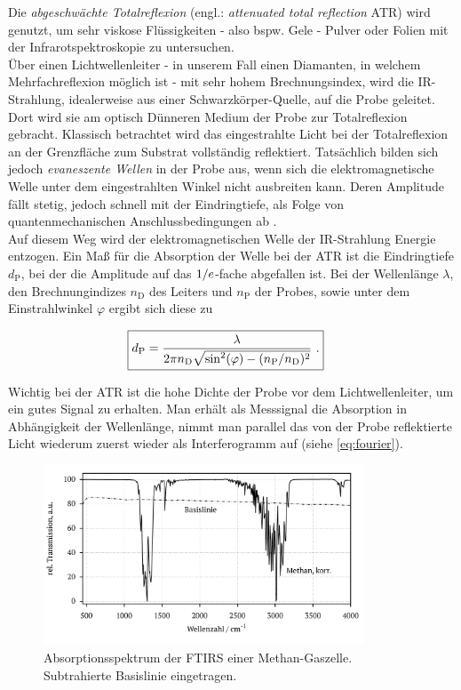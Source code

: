 \documentclass[numbers=noenddot,a4paper,10pt,twocolumn]{article}
\newcommand{\ix}[1]{_\text{#1}}
\newcommand{\tilt}[1]{\textit{#1}}
\newcommand{\euler}{\mathnormal{e}}
\begin{document}
		Die \tilt{abgeschw\"achte Totalreflexion} (engl.: \tilt{attenuated total reflection} ATR) wird genutzt, um sehr viskose Fl\"ussigkeiten - also bspw. Gele - Pulver oder Folien mit der Infrarotspektroskopie zu untersuchen.\\
		\"Uber einen Lichtwellenleiter - in unserem Fall einen Diamanten, in welchem Mehrfachreflexion m\"oglich ist - mit sehr hohem Brechnungsindex, wird die IR-Strahlung, idealerweise aus einer Schwarzk\"orper-Quelle, auf die Probe geleitet. Dort wird sie am optisch D\"unneren Medium der Probe zur Totalreflexion gebracht. Klassisch betrachtet wird das eingestrahlte Licht bei der Totalreflexion an der Grenzfl\"ache zum Substrat vollst\"andig reflektiert. Tats\"achlich bilden sich jedoch \tilt{evaneszente Wellen} in der Probe aus, wenn sich die elektromagnetische Welle unter dem eingestrahlten Winkel nicht ausbreiten kann. Deren Amplitude f\"allt stetig, jedoch schnell mit der Eindringtiefe, als Folge von quantenmechanischen Anschlussbedingungen ab \cite{FTIRInfra}.\\
		Auf diesem Weg wird der elektromagnetischen Welle der IR-Strahlung Energie entzogen. Ein Ma{\ss} f\"ur die Absorption der Welle bei der ATR ist die Eindringtiefe $d\ix{P}$, bei der die Amplitude auf das  $1/\euler$-fache abgefallen ist. Bei der Wellenl\"ange $\lambda$, den Brechnungindizes $n\ix{D}$ des Leiters und $n\ix{P}$ der Probes, sowie unter dem Einstrahlwinkel $\varphi$ ergibt sich diese zu
		
		\begin{align}
		\Aboxed{
			d\ix{P}=\frac{\lambda}{2\pi n\ix{D}\sqrt{\sin^{2}(\varphi)-(n\ix{P}/n\ix{D})^{2}}}\,\, .
		} \label{eq:atr}
		\end{align}
		
		Wichtig bei der ATR ist die hohe Dichte der Probe vor dem Lichtwellenleiter, um ein gutes Signal zu erhalten. Man erh\"alt als Messsignal die Absorption in Abh\"angigkeit der Wellenl\"ange, nimmt man parallel das von der Probe reflektierte Licht wiederum zuerst wieder als Interferogramm auf (siehe \autoref{eq:fourier}).

			\begin{figure}
			\centering
				\includegraphics[width=0.85\textwidth]{Gruppe2A/methan.pdf}
				\caption{Absorptionsspektrum der FTIRS einer Methan-Gaszelle. Subtrahierte Basislinie eingetragen.}
				\label{img:methan}
			\end{figure}
\end{document}
